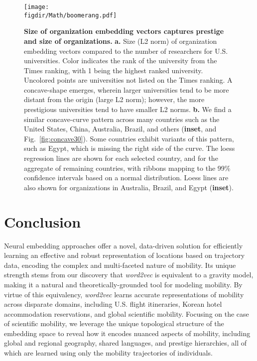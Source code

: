 \documentclass[12pt]{article} %
\def\figdir{../Figs}
\begin{document}
%
%
\begin{figure}[h!]
	\centering
	\texttt{[image: \\figdir/Math/boomerang.pdf]}
	\caption{
		\textbf{Size of organization embedding vectors captures prestige and size of organizations.}
		\textbf{a.} Size (L2 norm) of organization embedding vectors compared to the number of researchers for U.S. universities.
		Color indicates the rank of the university from the Times ranking, with 1 being the highest ranked university.
		Uncolored points are universities not listed on the Times ranking.
		A concave-shape emerges, wherein larger universities tend to be more distant from the origin (large L2 norm); however, the more prestigious universities tend to have smaller L2 norms.
		\textbf{b.} We find a similar concave-curve pattern across many countries such as the United States, China, Australia, Brazil, and others (\textbf{inset}, and Fig.~\ref{fig:concave30}).
		Some countries exhibit variants of this pattern, such as Egypt, which is missing the right side of the curve.
		The loess regression lines are shown for each selected country, and for the aggregate of remaining countries, with ribbons mapping to the 99\% confidence intervals based on a normal distribution.
		Loess lines are also shown for organizations in Australia, Brazil, and Egypt (\textbf{inset}).
	}
	\label{fig:length}
\end{figure}


%
%
\section*{Conclusion}

Neural embedding approaches offer a novel, data-driven solution for efficiently learning an effective and robust representation of locations based on trajectory data, encoding the complex and multi-faceted nature of mobility.
Its unique strength stems from our discovery that \textit{word2vec} is equivalent to a gravity model, making it a natural and theoretically-grounded tool for modeling mobility.
By virtue of this equivalency, \textit{word2vec} learns accurate representations of mobility across disparate domains, including U.S. flight itineraries, Korean hotel accommodation reservations, and global scientific mobility.
Focusing on the case of scientific mobility, we leverage the unique topological structure of the embedding space to reveal how it encodes nuanced aspects of mobility, including global and regional geography, shared languages, and prestige hierarchies, all of which are learned using only the mobility trajectories of individuals.
\end{document}
